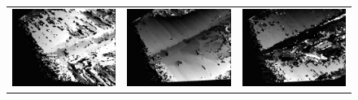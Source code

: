 \documentclass[11pt]{report}
\begin{document}
\begin{figure}[H]
\begin{tabular}{ccc}
    \includegraphics[scale=0.1]{images/disparity-opencv-t/disparity_19.png} &
    \includegraphics[scale=0.1]{images/disparity-opencv-d/disparity_19.png} &
    \includegraphics[scale=0.1]{images/disparity-opengv/disparity_19.png} \\
  \end{tabular}
\end{figure}
\end{document}
